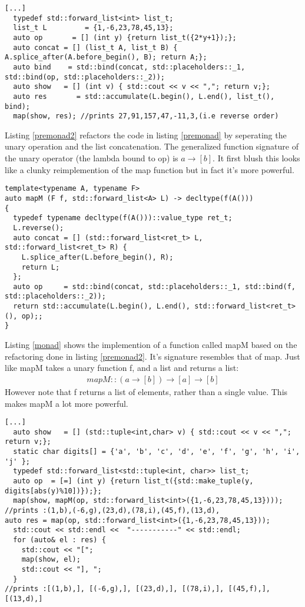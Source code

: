 \documentclass[12pt,fleqn]{article}
\begin{document}
\begin{lstlisting}[caption=unary operation and reduce,label=premonad2]
  [...]	
  typedef std::forward_list<int> list_t;
  list_t L         = {1,-6,23,78,45,13};
  auto op       = [] (int y) {return list_t({2*y+1});};
  auto concat = [] (list_t A, list_t B) { A.splice_after(A.before_begin(), B); return A;};
  auto bind    = std::bind(concat, std::placeholders::_1, std::bind(op, std::placeholders::_2));
  auto show   = [] (int v) { std::cout << v << ","; return v;};
  auto res       = std::accumulate(L.begin(), L.end(), list_t(), bind);
  map(show, res); //prints 27,91,157,47,-11,3,(i.e reverse order)
\end{lstlisting}
 Listing \ref{premonad2} refactors the code in listing \ref{premonad} by seperating the unary operation and the list concatenation.
The generalized function signature of the unary operator (the lambda bound to op) is $a \rightarrow [b]$.
It first blush this looks like a clunky reimplemention of the map function but in fact it's more powerful.
\begin{lstlisting}[caption=the list monad, label=listmonad]
  template<typename A, typename F>
auto mapM (F f, std::forward_list<A> L) -> decltype(f(A()))
{
  typedef typename decltype(f(A()))::value_type ret_t;
  L.reverse();
  auto concat = [] (std::forward_list<ret_t> L, std::forward_list<ret_t> R) { 
    L.splice_after(L.before_begin(), R); 
    return L;
  };
  auto op     = std::bind(concat, std::placeholders::_1, std::bind(f, std::placeholders::_2));
  return std::accumulate(L.begin(), L.end(), std::forward_list<ret_t>(), op);;
}
\end{lstlisting}
Listing \ref{monad} shows the implemention of a function called mapM based on the refactoring done in listing \ref{premonad2}.
It's signature resembles that of map.
Just like mapM takes a unary function f, and a list and returns a list:
\begin{eqnarray*}
mapM :: (a \rightarrow [b]) \rightarrow [a] \rightarrow [b]
\end{eqnarray*}
However note that f returns a list of elements, rather than a single value.
This makes mapM a lot more powerful.


\begin{lstlisting}[caption=comapring mapM and map, label=mapMvsmap] 
[...]
  auto show   = [] (std::tuple<int,char> v) { std::cout << v << ","; return v;};
  static char digits[] = {'a', 'b', 'c', 'd', 'e', 'f', 'g', 'h', 'i', 'j' };
  typedef std::forward_list<std::tuple<int, char>> list_t;
  auto op  = [=] (int y) {return list_t({std::make_tuple(y, digits[abs(y)%10])});};
  map(show, mapM(op, std::forward_list<int>({1,-6,23,78,45,13})));
//prints :(1,b),(-6,g),(23,d),(78,i),(45,f),(13,d),
auto res = map(op, std::forward_list<int>({1,-6,23,78,45,13}));
  std::cout << std::endl <<  "-----------" << std::endl;
  for (auto& el : res) {
    std::cout << "[";
    map(show, el);
    std::cout << "], ";
  }
//prints :[(1,b),], [(-6,g),], [(23,d),], [(78,i),], [(45,f),], [(13,d),]

\end{lstlisting}
\end{document}
